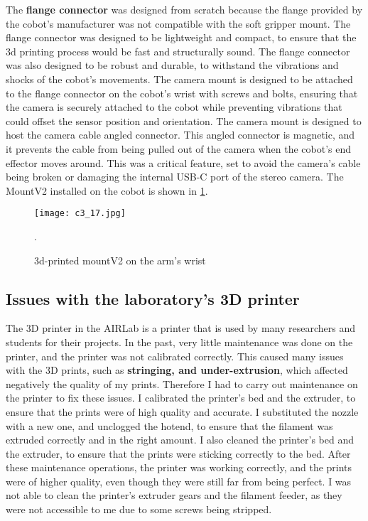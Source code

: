 The \textbf{flange connector} was designed from scratch because the flange provided by the cobot's manufacturer was not
compatible with the soft gripper mount. The flange connector was designed to be lightweight and compact, 
to ensure that the 3d printing process would be fast and structurally sound. The flange connector was also designed
to be robust and durable, to withstand the vibrations and shocks of the cobot's movements.
The camera mount is designed to be attached to the flange connector on the cobot's wrist with screws and bolts,
ensuring that the camera is securely attached to the cobot while preventing vibrations that could
offset the sensor position and orientation. The camera mount is designed to host the camera cable angled connector.
This angled connector is magnetic, and it prevents the cable from being pulled out of the camera when
the cobot's end effector moves around. This was a critical feature, set to avoid the camera's cable
being broken or damaging the internal USB-C port of the stereo camera. The MountV2 installed on the cobot
is shown in \ref{fig:c3_img17}.

\begin{figure}[t]
    \centering
    \texttt{[image: c3\_17.jpg]}
    \captionsetup{width=1\linewidth}
    \caption{3d-printed mountV2 on the arm's wrist}.
    \label{fig:c3_img17}
\end{figure}

\subsection{Issues with the laboratory's 3D printer}

The 3D printer in the AIRLab is a printer that is used by many researchers and students for their projects.
In the past, very little maintenance was done on the printer, and the printer was not calibrated correctly.
This caused many issues with the 3D prints, such as \textbf{stringing, and under-extrusion}, which affected negatively 
the quality of my prints. Therefore I had to carry out maintenance on the printer to fix these issues.
I calibrated the printer's bed and the extruder, to ensure that the prints were of high quality and accurate.
I substituted the nozzle with a new one, and unclogged the hotend, to ensure that the filament was extruded correctly
and in the right amount. I also cleaned the printer's bed and the extruder, to ensure that the prints were sticking
correctly to the bed. After these maintenance operations, the printer was working correctly, and the prints were of
higher quality, even though they were still far from being perfect. I was not able to clean the printer's
extruder gears and the filament feeder, as they were not accessible to me due to some screws being stripped.

